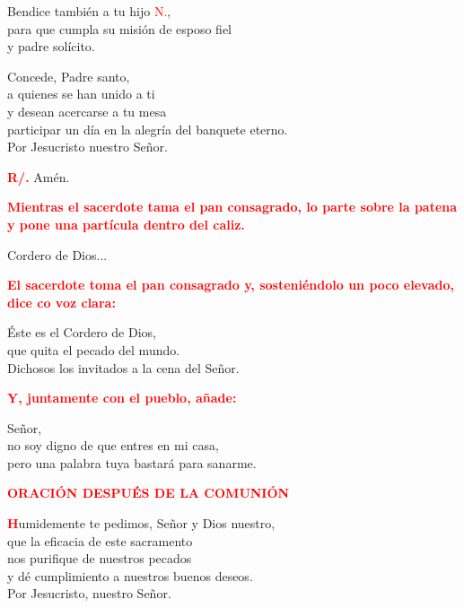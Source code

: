 \documentclass[12pt, letterpaper]{report}
\begin{document}
Bendice tambi\'en a tu hijo \textcolor{red}{N.}, \\
para que cumpla su misi\'on de esposo fiel \\
y padre sol\'icito. \newline

Concede, Padre santo, \\
a quienes se han unido a ti \\
y desean acercarse a tu mesa \\
participar un d\'ia en la alegr\'ia del banquete eterno. \\
Por Jesucristo nuestro Se\~nor. \newline

\Large \hspace{-0.9cm} {\bfseries \textcolor{red}{R/.}} \hspace{0.5cm} Am\'en.\newline

\newpage

\large{\bfseries \textcolor{red}{Mientras el sacerdote tama el pan consagrado, lo parte sobre la patena y pone una part\'icula dentro del caliz.}}\newline

\Large Cordero de Dios...\newline

\large{\bfseries \textcolor{red}{El sacerdote toma el pan consagrado y, sosteni\'endolo un poco elevado, dice co voz clara:}}\newline

\Large \'Este es el Cordero de Dios,\\
que quita el pecado del mundo.\\
Dichosos los invitados a la cena del Se\~nor. \newline


\large{\bfseries \textcolor{red}{Y, juntamente con el pueblo, a\~nade:}}\newline

\Large Se\~nor, \\
no soy digno de que entres en mi casa, \\
pero una palabra tuya bastar\'a para sanarme.\newline

\Large {\bfseries \textcolor{red}{ORACI\'ON DESPU\'ES DE LA COMUNI\'ON}}

\lettrine[lines=1]{\bfseries \textcolor{red}{H}}{}\Large umidemente te pedimos, Se\~nor y Dios nuestro, \\
que la eficacia de este sacramento \\
nos purifique de nuestros pecados \\
y d\'e cumplimiento a nuestros buenos deseos. \\
Por Jesucristo, nuestro Se\~nor.\newline
\end{document}
